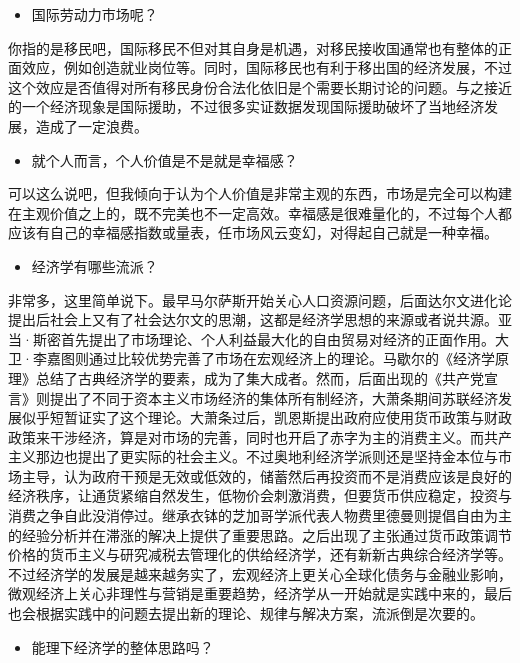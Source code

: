 \documentclass[
  letterpaper,
  DIV=11,
  numbers=noendperiod]{scrreprt}
\providecommand{\tightlist}{%
  \setlength{\itemsep}{0pt}\setlength{\parskip}{0pt}}\usepackage{longtable,booktabs,array}
\begin{document}
\begin{itemize}
\tightlist
\item
  国际劳动力市场呢？
\end{itemize}

你指的是移民吧，国际移民不但对其自身是机遇，对移民接收国通常也有整体的正面效应，例如创造就业岗位等。同时，国际移民也有利于移出国的经济发展，不过这个效应是否值得对所有移民身份合法化依旧是个需要长期讨论的问题。与之接近的一个经济现象是国际援助，不过很多实证数据发现国际援助破坏了当地经济发展，造成了一定浪费。

\begin{itemize}
\tightlist
\item
  就个人而言，个人价值是不是就是幸福感？
\end{itemize}

可以这么说吧，但我倾向于认为个人价值是非常主观的东西，市场是完全可以构建在主观价值之上的，既不完美也不一定高效。幸福感是很难量化的，不过每个人都应该有自己的幸福感指数或量表，任市场风云变幻，对得起自己就是一种幸福。

\begin{itemize}
\tightlist
\item
  经济学有哪些流派？
\end{itemize}

非常多，这里简单说下。最早马尔萨斯开始关心人口资源问题，后面达尔文进化论提出后社会上又有了社会达尔文的思潮，这都是经济学思想的来源或者说共源。亚当·斯密首先提出了市场理论、个人利益最大化的自由贸易对经济的正面作用。大卫·李嘉图则通过比较优势完善了市场在宏观经济上的理论。马歇尔的《经济学原理》总结了古典经济学的要素，成为了集大成者。然而，后面出现的《共产党宣言》则提出了不同于资本主义市场经济的集体所有制经济，大萧条期间苏联经济发展似乎短暂证实了这个理论。大萧条过后，凯恩斯提出政府应使用货币政策与财政政策来干涉经济，算是对市场的完善，同时也开启了赤字为主的消费主义。而共产主义那边也提出了更实际的社会主义。不过奥地利经济学派则还是坚持金本位与市场主导，认为政府干预是无效或低效的，储蓄然后再投资而不是消费应该是良好的经济秩序，让通货紧缩自然发生，低物价会刺激消费，但要货币供应稳定，投资与消费之争自此没消停过。继承衣钵的芝加哥学派代表人物费里德曼则提倡自由为主的经验分析并在滞涨的解决上提供了重要思路。之后出现了主张通过货币政策调节价格的货币主义与研究减税去管理化的供给经济学，还有新新古典综合经济学等。不过经济学的发展是越来越务实了，宏观经济上更关心全球化债务与金融业影响，微观经济上关心非理性与营销是重要趋势，经济学从一开始就是实践中来的，最后也会根据实践中的问题去提出新的理论、规律与解决方案，流派倒是次要的。

\begin{itemize}
\tightlist
\item
  能理下经济学的整体思路吗？
\end{itemize}
\end{document}
